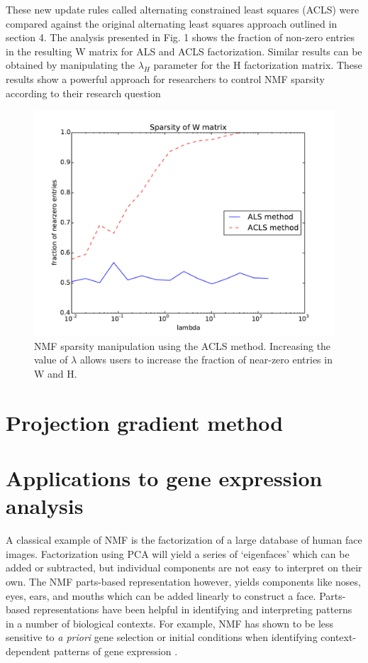 \documentclass[final,leqno,onefignum,onetabnum]{siamltex1213}
\begin{document}
These new update rules called alternating constrained least squares (ACLS)  were compared against the original alternating least squares approach outlined in section 4. The analysis presented in Fig. 1 shows the fraction of non-zero entries in the resulting W matrix for ALS and ACLS factorization. Similar results can be obtained by manipulating the $\lambda_H$ parameter for the H factorization matrix. These results show a powerful approach for researchers to control NMF sparsity according to their research question
\begin{figure}[t!]
  \centering
    \includegraphics[width=.5\linewidth]{ALS_vs_ACLS_sparsity}
  \caption{NMF sparsity manipulation using the ACLS method. Increasing the value of $\lambda$ allows users to increase the fraction of near-zero entries in W and H.}
\end{figure}


\section{Projection gradient method} 


\section{Applications to gene expression analysis}
A classical example of NMF is the factorization of a large database of human face images. Factorization using PCA will yield a series of `eigenfaces' which can be added or subtracted, but individual components are not easy to interpret on their own. The NMF parts-based representation however, yields components like noses, eyes, ears, and mouths which can be added linearly to construct a face. Parts-based representations have been helpful in identifying and interpreting patterns in a number of biological contexts. For example, NMF has shown to be less sensitive to \textit{a priori} gene selection or initial conditions when identifying context-dependent patterns of gene expression \cite{Bur}.  
\end{document}
